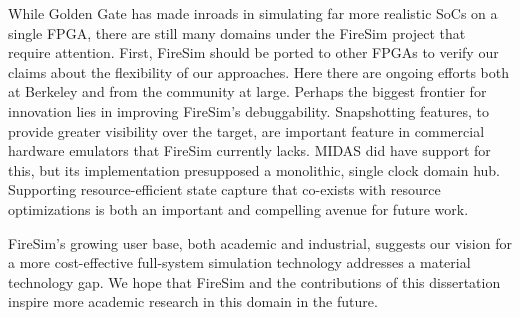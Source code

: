 While Golden Gate has made inroads in simulating far more realistic SoCs on a
single FPGA, there are still many domains under the FireSim project that
require attention.  First, FireSim should be ported to other FPGAs to verify
our claims about the flexibility of our approaches. Here there are ongoing
efforts both at Berkeley and from the community at large. Perhaps the biggest
frontier for innovation lies in improving FireSim's debuggability. Snapshotting
features, to provide greater visibility over the target, are important feature
in commercial hardware emulators that FireSim currently lacks. MIDAS did have
support for this, but its implementation presupposed a monolithic, single clock
domain hub.  Supporting resource-efficient state capture that co-exists with
resource optimizations is both an important and compelling avenue for future
work.

FireSim's growing user base, both academic and industrial, suggests our vision
for a more cost-effective full-system simulation technology addresses a
material technology gap. We hope that FireSim and the contributions of this
dissertation inspire more academic research in this domain in the future.
